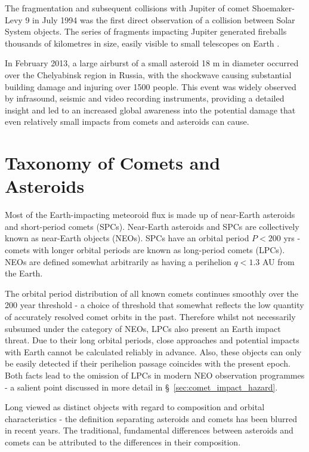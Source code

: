 The fragmentation and subsequent collisions with Jupiter of comet Shoemaker-Levy 9 in July 1994 was the first direct observation of a collision between Solar System objects. The series of fragments impacting Jupiter generated fireballs thousands of kilometres in size, easily visible to small telescopes on Earth \citep{2004jpsm.book..159H}. 

In February 2013, a large airburst of a small asteroid 18 m in diameter \citep{2013Natur.503..238B} occurred over the Chelyabinsk region in Russia, with the shockwave causing substantial building damage and injuring over 1500 people. This event was widely observed by infrasound, seismic and video recording instruments, providing a detailed insight and led to an increased global awareness into the potential damage that even relatively small impacts from comets and asteroids can cause.   

\section{Taxonomy of Comets and Asteroids}
\label{sec:taxonomy}

Most of the Earth-impacting meteoroid flux is made up of near-Earth asteroids and short-period comets (SPCs). Near-Earth asteroids and SPCs are collectively known as near-Earth objects (NEOs). SPCs have an orbital period $P < 200$ yrs - comets with longer orbital periods are known as long-period comets (LPCs). NEOs are defined somewhat arbitrarily as having a perihelion $q < 1.3$ AU from the Earth.

The orbital period distribution of all known comets continues smoothly over the 200 year threshold - a choice of threshold that somewhat reflects the low quantity of accurately resolved comet orbits in the past. Therefore whilst not necessarily subsumed under the category of NEOs, LPCs also present an Earth impact  threat. Due to their long orbital periods, close approaches and potential impacts with Earth cannot be calculated reliably in advance. Also, these objects can only be easily detected if their perihelion passage coincides with the present epoch. Both facts lead to the omission of LPCs in modern NEO observation programmes - a salient point discussed in more detail in \S~\ref{sec:comet_impact_hazard}.

Long viewed as distinct objects with regard to composition and orbital characteristics - the definition separating asteroids and comets has been blurred in recent years. The traditional, fundamental differences between asteroids and comets can be attributed to the differences in their composition.

